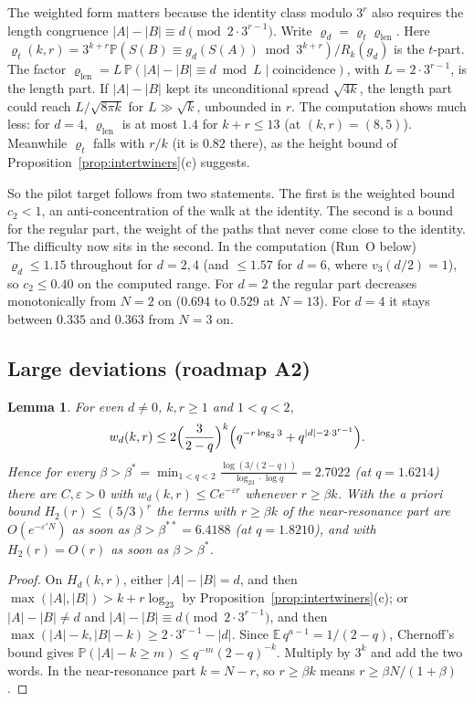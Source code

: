 \documentclass[11pt]{article}
\newtheorem{lemma}[theorem]{Lemma}
\theoremstyle{remark}
\newcommand{\E}{\mathbb E}
\newcommand{\Prob}{\mathbb P}
\begin{document}
The weighted form matters because the identity class modulo $3^r$ also requires the length congruence $|A|-|B|\equiv d\pmod{2\cdot3^{r-1}}$. Write $\varrho_d=\varrho_t\varrho_{\mathrm{len}}$. Here $\varrho_t(k,r)=3^{k+r}\Prob(S(B)\equiv g_d(S(A))\bmod3^{k+r})/R_k(g_d)$ is the $t$-part. The factor $\varrho_{\mathrm{len}}=L\,\Prob(|A|-|B|\equiv d\bmod L\mid\text{coincidence})$, with $L=2\cdot3^{r-1}$, is the length part. If $|A|-|B|$ kept its unconditional spread $\sqrt{4k}$, the length part could reach $L/\sqrt{8\pi k}$ for $L\gg\sqrt k$, unbounded in $r$. The computation shows much less: for $d=4$, $\varrho_{\mathrm{len}}$ is at most $1.4$ for $k+r\le13$ (at $(k,r)=(8,5)$). Meanwhile $\varrho_t$ falls with $r/k$ (it is $0.82$ there), as the height bound of Proposition~\ref{prop:intertwiners}(c) suggests.

So the pilot target follows from two statements. The first is the weighted bound $c_2<1$, an anti-concentration of the walk at the identity. The second is a bound for the regular part, the weight of the paths that never come close to the identity. The difficulty now sits in the second. In the computation (Run~O below) $\varrho_d\le1.15$ throughout for $d=2,4$ (and $\le1.57$ for $d=6$, where $v_3(d/2)=1$), so $c_2\le0.40$ on the computed range. For $d=2$ the regular part decreases monotonically from $N=2$ on ($0.694$ to $0.529$ at $N=13$). For $d=4$ it stays between $0.335$ and $0.363$ from $N=3$ on.

\subsection*{Large deviations (roadmap A2)}
\begin{lemma}\label{lem:largedev}
For even $d\ne0$, $k,r\ge1$ and $1<q<2$,
\[
 w_d(k,r)\le2\Bigl(\frac3{2-q}\Bigr)^k\Bigl(q^{-r\log_23}+q^{|d|-2\cdot3^{r-1}}\Bigr).
\]
Hence for every $\beta>\beta^*=\min_{1<q<2}\frac{\log(3/(2-q))}{\log_23\cdot\log q}=2.7022$ (at $q=1.6214$) there are $C,\varepsilon>0$ with $w_d(k,r)\le Ce^{-\varepsilon r}$ whenever $r\ge\beta k$. With the a priori bound $H_2(r)\le(5/3)^r$ the terms with $r\ge\beta k$ of the near-resonance part are $O(e^{-\varepsilon'N})$ as soon as $\beta>\beta^{**}=6.4188$ (at $q=1.8210$), and with $H_2(r)=O(r)$ as soon as $\beta>\beta^*$.
\end{lemma}

\begin{proof}
On $H_d(k,r)$, either $|A|-|B|=d$, and then $\max(|A|,|B|)>k+r\log_23$ by Proposition~\ref{prop:intertwiners}(c); or $|A|-|B|\ne d$ and $|A|-|B|\equiv d\pmod{2\cdot3^{r-1}}$, and then $\max(|A|-k,|B|-k)\ge2\cdot3^{r-1}-|d|$. Since $\E\,q^{a-1}=1/(2-q)$, Chernoff's bound gives $\Prob(|A|-k\ge m)\le q^{-m}(2-q)^{-k}$. Multiply by $3^k$ and add the two words. In the near-resonance part $k=N-r$, so $r\ge\beta k$ means $r\ge\beta N/(1+\beta)$.
\end{proof}
\end{document}
